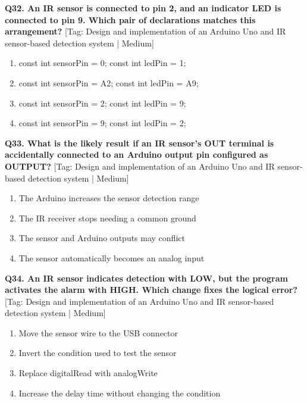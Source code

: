 \noindent\textbf{Q32. An IR sensor is connected to pin 2, and an indicator LED is connected to pin 9. Which pair of declarations matches this arrangement?} \hfill [Tag: Design and implementation of an Arduino Uno and IR sensor-based detection system | Medium]
\begin{enumerate}[label=(\alph*),topsep=2pt,itemsep=1pt,partopsep=0pt,parsep=0pt]
    \item {const int sensorPin = 0; const int ledPin = 1;}
    \item {const int sensorPin = A2; const int ledPin = A9;}
    \item {const int sensorPin = 2; const int ledPin = 9;}
    \item {const int sensorPin = 9; const int ledPin = 2;}
\end{enumerate}
\vspace{2mm}

\noindent\textbf{Q33. What is the likely result if an IR sensor's OUT terminal is accidentally connected to an Arduino output pin configured as OUTPUT?} \hfill [Tag: Design and implementation of an Arduino Uno and IR sensor-based detection system | Medium]
\begin{enumerate}[label=(\alph*),topsep=2pt,itemsep=1pt,partopsep=0pt,parsep=0pt]
    \item {The Arduino increases the sensor detection range}
    \item {The IR receiver stops needing a common ground}
    \item {The sensor and Arduino outputs may conflict}
    \item {The sensor automatically becomes an analog input}
\end{enumerate}
\vspace{2mm}

\noindent\textbf{Q34. An IR sensor indicates detection with LOW, but the program activates the alarm with HIGH. Which change fixes the logical error?} \hfill [Tag: Design and implementation of an Arduino Uno and IR sensor-based detection system | Medium]
\begin{enumerate}[label=(\alph*),topsep=2pt,itemsep=1pt,partopsep=0pt,parsep=0pt]
    \item {Move the sensor wire to the USB connector}
    \item {Invert the condition used to test the sensor}
    \item {Replace digitalRead with analogWrite}
    \item {Increase the delay time without changing the condition}
\end{enumerate}
\vspace{2mm}


